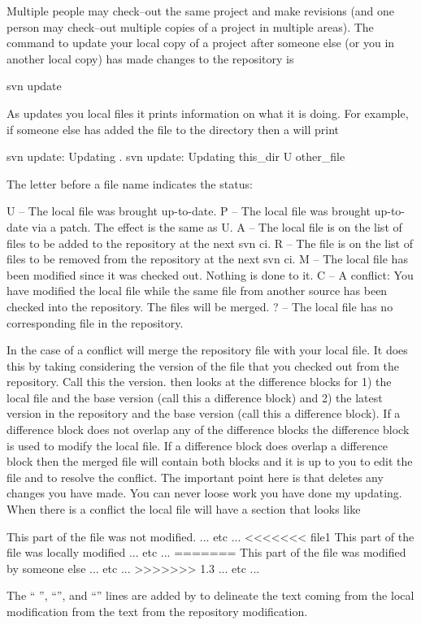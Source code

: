 Multiple people may check--out the same project and make revisions
(and one person may check--out multiple copies of a project in
multiple areas). The command to update your local copy of a project
after someone else (or you in another local copy) has made changes to
the repository is
\begin{example}
  svn update
\end{example}
As \svn updates you local files it prints information on what it is
doing. For example, if someone else has added the file 
to the  directory then a  will print
\begin{example}
  svn update: Updating .
  svn update: Updating this_dir
  U other_file
\end{example}
The letter before a file name indicates the status:
\begin{example}
  U -- The local file was brought up-to-date.
  P -- The local file was brought up-to-date via a patch. The effect is the same as U.
  A -- The local file is on the list of files to be added to the repository
          at the next svn ci.
  R -- The file is on the list of files to be removed from the repository
          at the next svn ci.
  M -- The local file has been modified since it was checked out. 
          Nothing is done to it.
  C -- A conflict: You have modified the local file while the same file
          from another source has been checked into the repository.
          The files will be merged.
  ? -- The local file has no corresponding file in the repository.
\end{example}
In the case of a conflict \svn will merge the repository file with
your local file. It does this by taking considering the version of the
file that you checked out from the repository. Call this the 
version. \svn then looks at the difference blocks for 1) the local
file and the base version (call this a  difference block)
and 2) the latest version in the repository and the base version (call
this a  difference block). If a 
difference block does not overlap any of the  difference
blocks the difference block is used to modify the local file. If a
 difference block does overlap a  difference
block then the merged file will contain both blocks and it is up to
you to edit the file and to resolve the conflict. The important point
here is that  deletes any changes you have made. You
can never loose work you have done my updating. When there is a
conflict the local file will have a section that looks like
\begin{example}
  This part of the file was not modified.
  ... etc ...
  <<<<<<< file1
  This part of the file was locally modified
  ... etc ...
  =======
  This part of the file was modified by someone else
  ... etc ...
  >>>>>>> 1.3
  ... etc ...
\end{example}
The ``\vn{<{<}<{<}<{<}<} '', ``\vn{=======}'', and ``''
lines are added by \svn to delineate the text coming from the local
modification from the text from the repository modification.

